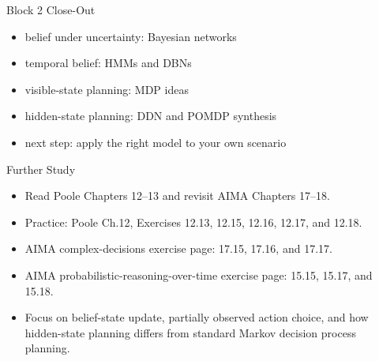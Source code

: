 \documentclass[aspectratio=169]{beamer}
\begin{document}
\begin{frame}{Block 2 Close-Out}
\begin{itemize}
  \item belief under uncertainty: Bayesian networks
  \item temporal belief: HMMs and DBNs
  \item visible-state planning: MDP ideas
  \item hidden-state planning: DDN and POMDP synthesis
  \item next step: apply the right model to your own scenario
\end{itemize}
\end{frame}

\begin{frame}{Further Study}
\begin{itemize}
  \item Read Poole Chapters 12--13 and revisit AIMA Chapters 17--18.
  \item Practice: Poole Ch.12, Exercises 12.13, 12.15, 12.16, 12.17, and 12.18.
  \item AIMA complex-decisions exercise page: 17.15, 17.16, and 17.17.
  \item AIMA probabilistic-reasoning-over-time exercise page: 15.15, 15.17, and 15.18.
  \item Focus on belief-state update, partially observed action choice, and how hidden-state planning differs from standard Markov decision process planning.
\end{itemize}
\end{frame}
\end{document}
